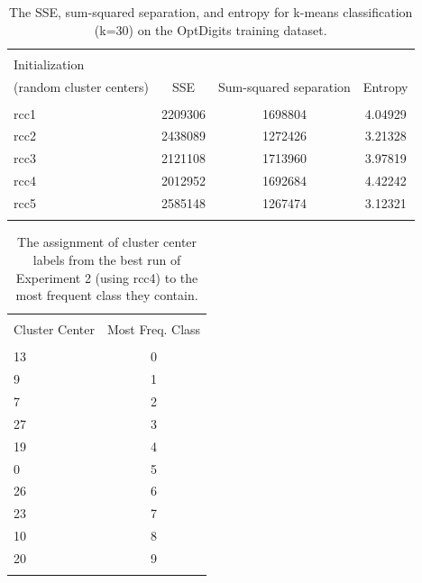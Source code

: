 \documentclass[12pt]{article}
\begin{document}
\begin{table} \centering 
  \caption{The SSE, sum-squared separation, and entropy for k-means classification (k=30) on the OptDigits training dataset.} 
  \label{tab:b1} 
\begin{tabular}{lccc} \\
[-1.8ex] \hline \hline \\[-1.8ex] 
 Initialization &&& \\ 
 (random cluster centers) & SSE & Sum-squared separation & Entropy\\
\hline \\[-1.8ex]
rcc1 & 2209306 & 1698804 & 4.04929\\
rcc2 & 2438089 & 1272426 & 3.21328\\
rcc3 & 2121108 & 1713960 & 3.97819\\
rcc4 & 2012952 & 1692684 & 4.42242\\
rcc5 & 2585148 & 1267474 & 3.12321\\
\hline \\[-1.8ex]
\end{tabular} 
\end{table}


\begin{table} \centering 
  \caption{The assignment of cluster center labels from the best run of Experiment 2 (using rcc4) to the most frequent class they contain.} 
  \label{tab:b2} 
\begin{tabular}{lc} \\
[-1.8ex] \hline \hline \\[-1.8ex] 
 Cluster Center & Most Freq. Class \\ 
 \hline \\[-1.8ex]
13 & 0\\
9 & 1\\
7 & 2\\
27 & 3\\
19 & 4\\
0 & 5\\
26 & 6 \\
23 & 7\\
10 & 8\\
20 & 9\\
\hline \\[-1.8ex]
\end{tabular} 
\end{table}
\end{document}
